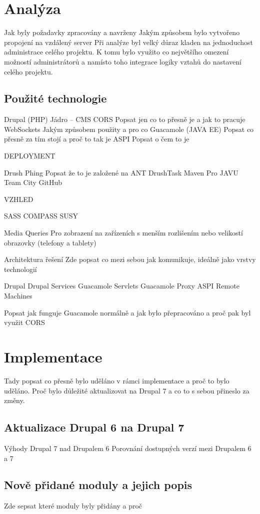 \documentclass[11pt,draft,oneside]{fithesis2}
\begin{document}
\chapter{Analýza}

Jak byly požadavky zpracovány a navrženy
Jakým způsobem bylo vytvořeno propojení na vzdálený server
Při analýze byl velký důraz kladen na jednoduchost administrace celého projektu. K tomu bylo využito co největšího omezení možností administrátorů a namísto toho integrace logiky vztahů do nastavení celého projektu.

\section{Použité technologie}

Drupal (PHP)
Jádro – CMS
CORS
Popsat jen co to přesně je a jak to pracuje
WebSockets
Jakým způsobem použity a pro co
Guacamole (JAVA EE)
Popsat co přesně za tím stojí a proč to tak je
ASPI
Popsat o čem to je

DEPLOYMENT

Drush 
Phing
Popsat že to je založené na ANT
DrushTask
Maven
Pro JAVU
Team City
GitHub

VZHLED

SASS
COMPASS
SUSY


Media Queries
Pro zobrazení na zařízeních s menším rozlišením nebo velikostí obrazovky (telefony a tablety)

Architektura řešení
Zde popsat co mezi sebou jak komunikuje, ideálně jako vrstvy technologií

Drupal
Drupal Services
Guacamole Servlets
Guacamole Proxy
ASPI Remote Machines

Popsat jak funguje Guacamole normálně a jak bylo přepracováno a proč pak byl využit CORS


\chapter{Implementace}

Tady popsat co přesně bylo uděláno v rámci implementace a proč to bylo uděláno. Proč bylo důležité aktualizovat na Drupal 7 a co to s sebou přineslo za změny.
\section{Aktualizace Drupal 6 na Drupal 7}
Výhody Drupal 7 nad Drupalem 6
Porovnání dostupných verzí mezi Drupalem 6 a 7
\section{Nově přidané moduly a jejich popis}
Zde sepsat které moduly byly přidány a proč
\end{document}
